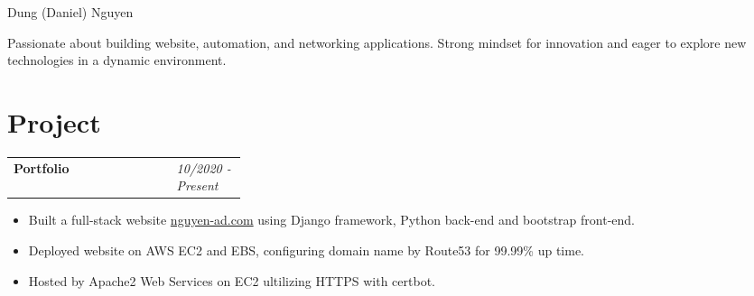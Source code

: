 \documentclass[11pt]{article} %
\begin{document}
\begin{paracol}{2} %


\parbox[top][0.01\textheight][c]{\linewidth}{ %
	\vspace{-0.01\textheight} %
	\centering %
	{\sffamily\Huge Dung (Daniel) Nguyen}\\ \medskip %
	\raggedright Passionate about building website, automation, and networking applications. 
	Strong mindset for innovation and eager to explore new technologies in a dynamic environment.
}
\medskip
\medskip
\medskip

\section{Project}
\begin{supertabular}{p{.65\linewidth}p{0.3\linewidth}}
			
   \Large\textbf{Portfolio} \raggedright & \textit{10/2020 - Present} \\ 
\end{supertabular}
\begin{itemize}
	\setlength\itemsep{-0.5em}
    \item Built a full-stack website \href{https://www.nguyen-ad.com}{nguyen-ad.com} using Django
	framework, Python back-end and bootstrap front-end.
    \item Deployed website on AWS EC2 and EBS, configuring domain name by Route53 for 99.99\% up time.
    \item Hosted by Apache2 Web Services on EC2 ultilizing HTTPS with certbot.
\end{itemize}


\end{paracol}
\end{document}
